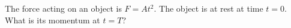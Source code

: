 The force acting on an object is
$F = A t^2$. The object is at rest at time
$t=0$. What is its momentum at $t=T$?\answercheck
